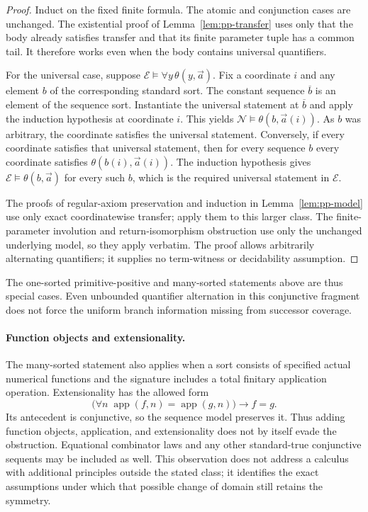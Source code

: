 \begin{proof}
Induct on the fixed finite formula.  The atomic and conjunction cases
are unchanged.  The existential proof of
Lemma~\ref{lem:pp-transfer} uses only that the body already satisfies
transfer and that its finite parameter tuple has a common tail.
It therefore works even when the body contains universal quantifiers.

For the universal case, suppose
$\mathcal E\models\forall y\,\theta(y,\vec a)$.  Fix a
coordinate $i$ and any element $b$ of the corresponding standard sort.
The constant sequence $\overline b$ is an element of the sequence
sort.  Instantiate the universal statement at $\overline b$ and apply
the induction hypothesis at coordinate $i$.  This yields
$\mathcal N\models\theta(b,\vec a(i))$.  As $b$ was arbitrary,
the coordinate satisfies the universal statement.  Conversely, if
every coordinate satisfies that universal statement, then for every
sequence $b$ every coordinate satisfies $\theta(b(i),\vec a(i))$.
The induction hypothesis gives
$\mathcal E\models\theta(b,\vec a)$ for every such $b$,
which is the required universal statement in $\mathcal E$.

The proofs of regular-axiom preservation and induction in
Lemma~\ref{lem:pp-model} use only exact coordinatewise transfer;
apply them to this larger class.  The finite-parameter involution and
return-isomorphism obstruction use only the unchanged underlying model,
so they apply verbatim.  The proof allows arbitrarily alternating
quantifiers; it supplies no term-witness or decidability assumption.
\end{proof}

The one-sorted primitive-positive and many-sorted statements above are
thus special cases.  Even unbounded quantifier alternation in this
conjunctive fragment does not force the uniform branch information
missing from successor coverage.

\paragraph{Function objects and extensionality.}
The many-sorted statement also applies when a sort consists of specified
actual numerical functions and the signature includes a total finitary
application operation. Extensionality has the allowed form
\[
 \bigl(\forall n\;\operatorname{app}(f,n)=\operatorname{app}(g,n)\bigr)
       \to f=g.
\]
Its antecedent is conjunctive, so the sequence model preserves it.
Thus adding function objects, application, and extensionality does not
by itself evade the obstruction. Equational combinator laws and any
other standard-true conjunctive sequents may be included as well.
This observation does not address a calculus with additional principles
outside the stated class; it identifies the exact assumptions under
which that possible change of domain still retains the symmetry.

